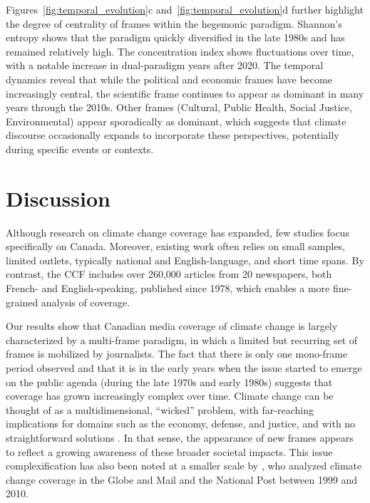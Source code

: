 \documentclass[12pt]{article}
\begin{document}
Figures~\ref{fig:temporal_evolution}c and~\ref{fig:temporal_evolution}d further highlight the degree of centrality of frames within the hegemonic paradigm. Shannon's entropy shows that the paradigm quickly diversified in the late 1980s and has remained relatively high. The concentration index shows fluctuations over time, with a notable increase in dual-paradigm years after 2020. The temporal dynamics reveal that while the political and economic frames have become increasingly central, the scientific frame continues to appear as dominant in many years through the 2010s. Other frames (Cultural, Public Health, Social Justice, Environmental) appear sporadically as dominant, which suggests that climate discourse occasionally expands to incorporate these perspectives, potentially during specific events or contexts.

\section{Discussion}

Although research on climate change coverage has expanded, few studies focus specifically on Canada. Moreover, existing work often relies on small samples, limited outlets, typically national and English-language, and short time spans. By contrast, the CCF includes over 260,000 articles from 20 newspapers, both French- and English-speaking, published since 1978, which enables a more fine-grained analysis of coverage. 

Our results show that Canadian media coverage of climate change is largely characterized by a multi-frame paradigm, in which a limited but recurring set of frames is mobilized by journalists. The fact that there is only one mono-frame period observed and that it is in the early years when the issue started to emerge on the public agenda (during the late 1970s and early 1980s) suggests that coverage has grown increasingly complex over time. Climate change can be thought of as a multidimensional, ``wicked'' problem, with far-reaching implications for domains such as the economy, defense, and justice, and with no straightforward solutions \autocite{grundmannClimateChangeWicked2016}. In that sense, the appearance of new frames appears to reflect a growing awareness of these broader societal impacts. This issue complexification has also been noted at a smaller scale by \autocite{stoddartCanadianNewsMedia2015}, who analyzed climate change coverage in the Globe and Mail and the National Post between 1999 and 2010.
\end{document}
